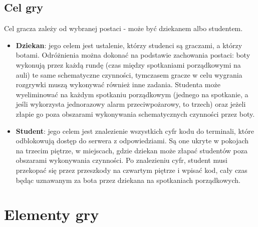 \documentclass[]{report}
\begin{document}
\subsection{Cel gry}
Cel gracza zależy od wybranej postaci - może być dziekanem albo studentem.
\begin{itemize}
	\item \textbf{Dziekan}: jego celem jest ustalenie, którzy studenci są graczami, a którzy botami. Odróżnienia można dokonać na podstawie zachowania postaci: boty wykonują przez każdą rundę (czas między spotkaniami porządkowymi na auli) te same schematyczne czynności, tymczasem gracze w celu wygrania rozgrywki muszą wykonywać również inne zadania. Studenta może wyeliminować na każdym spotkaniu porządkowym (jednego na spotkanie, a jeśli wykorzysta jednorazowy alarm przeciwpożarowy, to trzech) oraz jeżeli złapie go poza obszarami wykonywania schematycznych czynności przez boty.
	\item \textbf{Student}: jego celem jest znalezienie wszystkich cyfr kodu do terminali, które odblokowują dostęp do serwera z odpowiedziami. Są one ukryte w pokojach na trzecim piętrze, w miejscach, gdzie dziekan może złapać studentów poza obszarami wykonywania czynności. Po znalezieniu cyfr, student musi przekopać się przez przeszkody na czwartym piętrze i wpisać kod, cały czas będąc uznawanym za bota przez dziekana na spotkaniach porządkowych.
\end{itemize}

\section{Elementy gry}
\end{document}

